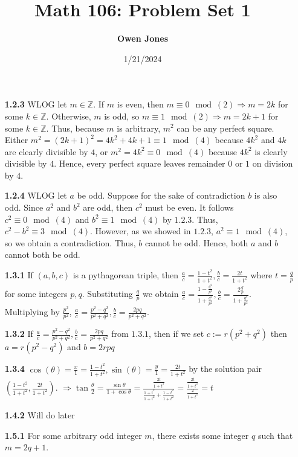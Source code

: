\documentclass[10pt]{article}
\title{\bf Math 106: Problem Set 1}
\date{1/21/2024}
\author{\bf Owen Jones}
\begin{document}
\maketitle
\begin{enumerate}
    \item [\bf{1.2.3}] WLOG let $m\in\mathbb{Z}$. 
    If $m$ is even, then $m\equiv 0\mod(2)\Rightarrow m=2k$ for some $k\in\mathbb{Z}$.
    Otherwise, $m$ is odd, so $m\equiv 1\mod(2)\Rightarrow m=2k+1$ for some $k\in\mathbb{Z}$.
    Thus, because $m$ is arbitrary, $m^2$ can be any perfect square.
    Either $m^2={(2k+1)}^2=4k^2+4k+1\equiv 1\mod(4)$ because $4k^2$ and $4k$ are clearly divisible by $4$, or $m^2=4k^2\equiv 0\mod(4)$ because $4k^2$ is clearly divisible by $4$. 
    Hence, every perfect square leaves remainder $0$ or $1$ on division by $4$.
    \item [\bf{1.2.4}] WLOG let $a$ be odd. 
    Suppose for the sake of contradiction $b$ is also odd. 
    Since $a^2$ and $b^2$ are odd, then $c^2$ must be even. 
    It follows $c^2\equiv 0\mod(4)$ and $b^2\equiv 1\mod(4)$ by $\mathbf{1.2.3}$.
    Thus, $c^2-b^2\equiv 3\mod(4)$.
    However, as we showed in $\mathbf{1.2.3}$, $a^2\equiv 1\mod(4)$, so we obtain a contradiction.
    Thus, $b$ cannot be odd.
    Hence, both $a$ and $b$ cannot both be odd.
    \item [\bf{1.3.1}] If $(a,b,c)$ is a pythagorean triple, then $\frac{a}{c}=\frac{1-t^2}{1+t^2},\frac{b}{c}=\frac{2t}{1+t^2}$ where $t=\frac{q}{p}$ for some integers $p,q$. 
    Substituting $\frac{q}{p}$ we obtain $\frac{a}{c}=\frac{1-\frac{q^2}{p^2}}{1+\frac{q^2}{p^2}},\frac{b}{c}=\frac{2\frac{q}{p}}{1+\frac{q^2}{p^2}}$. 
    Multiplying by $\frac{p^2}{p^2}$, $\frac{a}{c}=\frac{p^2-q^2}{p^2+q^2},\frac{b}{c}=\frac{2pq}{p^2+q^2}$.
    \item [\bf{1.3.2}] If $\frac{a}{c}=\frac{p^2-q^2}{p^2+q^2},\frac{b}{c}=\frac{2pq}{p^2+q^2}$ from $\mathbf{1.3.1}$, then if we set $c:=r(p^2+q^2)$ then $a=r(p^2-q^2)$ and $b=2rpq$
    \item [\bf{1.3.4}] $\cos(\theta)=\frac{x}{1}=\frac{1-t^2}{1+t^2},\sin(\theta)=\frac{y}{1}=\frac{2t}{1+t^2}$ by the solution pair $(\frac{1-t^2}{1+t^2},\frac{2t}{1+t^2})$. $\Rightarrow \tan\frac{\theta}{2}=\frac{\sin\theta}{1+\cos\theta}=\frac{\frac{2t}{1+t^2}}{\frac{1+t^2}{1+t^2}+\frac{1-t^2}{1+t^2}}=\frac{\frac{2t}{1+t^2}}{\frac{2}{1+t^2}}=t$
    \item [\bf{1.4.2}] Will do later
    \item [\bf{1.5.1}] For some arbitrary odd integer $m$, there exists some integer $q$ such that $m=2q+1$. 

\end{enumerate}
\end{document}
